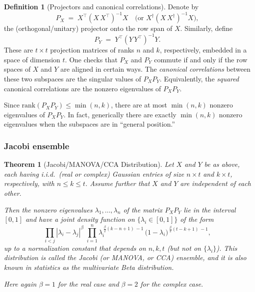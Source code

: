 \documentclass[letterpaper,11pt,oneside,reqno]{article}
\numberwithin{equation}{section}
\newtheorem{theorem}[proposition]{Theorem}
\theoremstyle{definition}
\newtheorem{definition}[proposition]{Definition}
\begin{document}
\begin{definition}[Projectors and canonical correlations]
Denote by
\[
  P_X \;=\; X^\top\!(X\,X^\top)^{-1}X
  \quad\bigl(\text{or }X^\dagger(X\,X^\dagger)^{-1}X\bigr),
\]
the (orthogonal/unitary) projector onto the row span of \(X\).
Similarly, define
\[
  P_Y \;=\; Y^\top\!(Y\,Y^\top)^{-1}Y.
\]
These are \(t\times t\) projection matrices of ranks \(n\) and \(k\), respectively, embedded in a space of dimension \(t\).  One checks that \(P_X\) and \(P_Y\) commute if and only if the row spaces of \(X\) and \(Y\) are aligned in certain ways.  The \emph{canonical correlations} between these two subspaces are the singular values of \(P_X P_Y\).  Equivalently, the \emph{squared} canonical correlations are the nonzero eigenvalues of \(P_X P_Y\).
\end{definition}

Since \(\mathrm{rank}(P_X P_Y)\le \min(n,k)\), there are at most \(\min(n,k)\) nonzero eigenvalues of \(P_X P_Y\).  In fact, generically there are exactly \(\min(n,k)\) nonzero eigenvalues when the subspaces are in ``general position.''

\subsubsection{Jacobi ensemble}

\begin{theorem}[Jacobi/MANOVA/CCA Distribution]
\label{thm:Jacobi_distribution}
Let \(X\) and \(Y\) be as above, each having i.i.d.\ (real or complex) Gaussian entries of size \(n\times t\) and \(k\times t\), respectively, with \(n\le k \le t\).  Assume further that \(X\) and \(Y\) are independent of each other.

Then the nonzero eigenvalues \(\lambda_1,\ldots,\lambda_n\) of the matrix \(P_X P_Y\) lie in the interval \([0,1]\) and have a joint density function on \(\{\lambda_i\in[0,1]\}\) of the form
\[
  \prod_{i<j} |\lambda_i - \lambda_j|^\beta
  \;\prod_{i=1}^n
  \lambda_i^{\,\frac{\beta}{2}(k-n+1)\,-1}
  \,\bigl(1-\lambda_i\bigr)^{\,\frac{\beta}{2}(t-k+1)\,-1},
\]
up to a normalization constant that depends on \(n,k,t\) (but not on \(\{\lambda_i\}\)).  This distribution is called the \emph{Jacobi} (or \emph{MANOVA}, or \emph{CCA}) ensemble, and it is also known in statistics as the \emph{multivariate Beta distribution}.

Here again \(\beta=1\) for the real case and \(\beta=2\) for the complex case.
\end{theorem}
\end{document}
